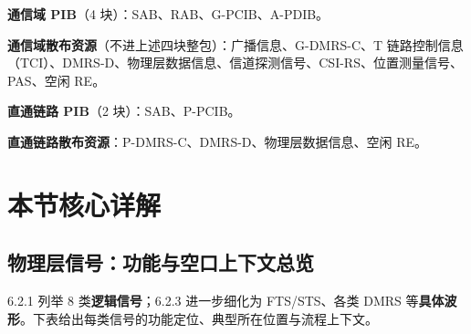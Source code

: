 \documentclass[11pt,a4paper]{ctexart}
\begin{document}
\textbf{通信域 PIB}（4 块）：SAB、RAB、G-PCIB、A-PDIB。

\textbf{通信域散布资源}（不进上述四块整包）：广播信息、G-DMRS-C、T 链路控制信息（TCI）、DMRS-D、物理层数据信息、信道探测信号、CSI-RS、位置测量信号、PAS、空闲 RE。

\textbf{直通链路 PIB}（2 块）：SAB、P-PCIB。

\textbf{直通链路散布资源}：P-DMRS-C、DMRS-D、物理层数据信息、空闲 RE。

\section{本节核心详解}

\subsection{物理层信号：功能与空口上下文总览}

6.2.1 列举 8 类\textbf{逻辑信号}；6.2.3 进一步细化为 FTS/STS、各类 DMRS 等\textbf{具体波形}。下表给出每类信号的功能定位、典型所在位置与流程上下文。
\end{document}
